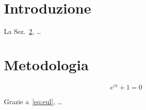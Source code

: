 \documentclass{article}
\begin{document}
\section{Introduzione}
\label{sec:intro}
La Sez.~\ref{sec:metodo}, \ldots

\section{Metodologia}
\label{sec:metodo}

\begin{equation}\label{eq:eul}
e^{i\pi} + 1 = 0
\end{equation}

Grazie a~\eqref{eq:eul}, \ldots
\end{document}
